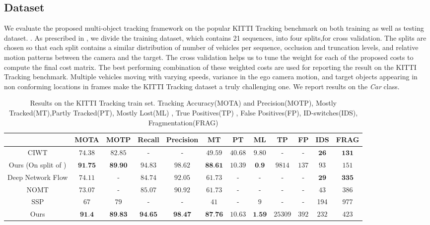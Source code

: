 \documentclass[letterpaper, 10 pt, conference]{ieeeconf}
\begin{document}
\subsection{Dataset}
We evaluate the proposed multi-object tracking framework on the popular KITTI Tracking benchmark on both training as well as testing dataset. \cite{KITTI}. As prescribed in \cite{DeepNetworkFlow,NOMT,KITTI}, we divide the training dataset, which contains 21 sequences, into four splits,for cross validation. The splits are chosen so that each split contains a similar distribution of number of vehicles per sequence, occlusion and truncation levels, and relative motion patterns between the camera and the target. The cross validation helps us to tune the weight for each of the proposed costs to compute the final cost matrix. The best performing combination of these weighted costs are used for reporting the result on the KITTI Tracking benchmark. Multiple vehicles moving with varying speeds, variance in the ego camera motion, and target objects appearing in non conforming locations in frames make the KITTI Tracking dataset \cite{KITTI} a truly challenging one. We report results on the \emph{Car} class.

\begin{table*}[!hbt]
	\centering
    
    \caption{Results on the KITTI Tracking train set. Tracking Accuracy(MOTA) and Precision(MOTP), Mostly Tracked(MT),Partly Tracked(PT), Mostly Lost(ML) , True Positives(TP) , False Positives(FP), ID-switches(IDS), Fragmentation(FRAG) }
    
    \begin{adjustbox}{max width=\linewidth}    
	\begin{tabular}{|c|c|c|c|c|c|c|c|c|c|c|c|}
		\hline\hline
    	 &  MOTA & MOTP & Recall & Precision & MT & PT & ML & TP & FP & IDS & FRAG \\
      	\hline\hline
     	CIWT \cite{CIWT} & $74.38$ & $82.85$ & - & - & $49.59$ & $40.68$ & $9.80$ & - & - & $\textbf{26}$ & $\textbf{131}$ \\
    	\hline
        Ours (On split of \cite{CIWT}) & $\textbf{91.75}$ & $\textbf{89.90}$ & $94.83$ & $98.62$ & $\textbf{88.61}$ & $10.39$ & $\textbf{0.9}$ & $9814$ & $137$ & $93$ & $151$ \\
    	\hline\hline
    	Deep Network Flow \cite{DeepNetworkFlow} & $74.11$ & - & $84.74$ & $92.05$ & $61.73$ & - & - & - & - & $\textbf{29}$ & $\textbf{335}$ \\
        \hline
        NOMT \cite{NOMT} & $73.07$ & - & $85.07$ & $90.92$ & $61.73$ & - & - & - & - & $43$ & $386$ \\
        \hline
        SSP \cite{followme} & $67$ & $79$ & - & - & $41$ & - & $9$ & - & - & 194 & 977 \\
    	\hline
    	Ours & $\textbf{91.4}$ & $\textbf{89.83}$ & $\textbf{94.65}$ & $\textbf{98.47}$ & $\textbf{87.76}$ & $10.63$ & $\textbf{1.59}$ & $25309$ & $392$ & $232$ & $423$ \\
    	\hline
        
	\end{tabular}
    \end{adjustbox}
    \label{table:overall}
\end{table*}
\end{document}
